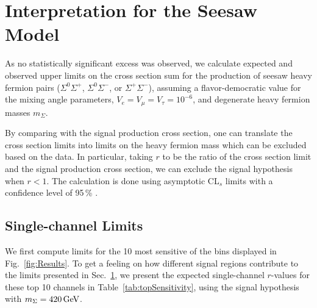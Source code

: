 \section{Interpretation for the Seesaw Model}
\label{sec:Interpretation}
\label{sec:Interpretation/Seesaw}

As no statistically significant excess was observed, we calculate expected and observed upper limits on the cross section sum for the production of seesaw heavy fermion pairs ($\Sigma^0\Sigma^+$, $\Sigma^0\Sigma^-$, or $\Sigma^+\Sigma^-$), assuming a flavor-democratic value for the mixing angle parameters, $V_e = V_\mu = V_\tau = 10^{-6}$, and degenerate heavy fermion masses $m_\Sigma$.

By comparing with the signal production cross section, one can translate the cross section limits into limits on the heavy fermion mass which can be excluded based on the data. In particular, taking $r$ to be the ratio of the cross section limit and the signal production cross section, we can exclude the signal hypothesis when $r < 1$.
The calculation is done using asymptotic CL$_s$ limits with a confidence level of 95\,\% \cite{Junk:1999kv,Read:2000ru,Read:2002hq}.

\subsection{Single-channel Limits}
\label{sec:Results/singleChannel}

We first compute limits for the 10 most sensitive of the bins displayed in Fig.~\ref{fig:Results}. To get a feeling on how different signal regions contribute to the limits presented in Sec.~\ref{sec:Interpretation}, we present the expected single-channel $r$-values for these top 10 channels in Table~\ref{tab:topSensitivity}, using the signal hypothesis with $m_\Sigma = 420\,\text{Ge\hspace{-.08em}V}$.

